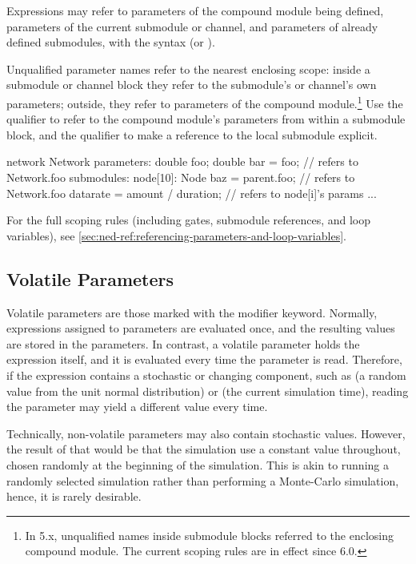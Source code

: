 Expressions may refer to parameters of the compound module being defined,
parameters of the current submodule or channel, and parameters of already
defined submodules, with the syntax  (or
).

Unqualified parameter names refer to the nearest enclosing scope: inside a
submodule or channel block they refer to the submodule's or channel's own
parameters; outside, they refer to parameters of the compound
module.\footnote{In {\opp} 5.x, unqualified names inside submodule blocks
referred to the enclosing compound module. The current scoping rules are in
effect since {\opp} 6.0.} Use the  qualifier to refer to
the compound module's parameters from within a submodule block, and the
 qualifier to make a reference to the local submodule explicit.

\begin{ned}
network Network
{
    parameters:
        double foo;
        double bar = foo;  // refers to Network.foo
    submodules:
        node[10]: Node {
            baz = parent.foo;  // refers to Network.foo
            datarate = amount / duration;  // refers to node[i]'s params
        }
    ...
}
\end{ned}

For the full scoping rules (including gates, submodule references, and loop
variables), see \ref{sec:ned-ref:referencing-parameters-and-loop-variables}.


\subsection{Volatile Parameters}
\label{sec:ned-lang:volatile}

Volatile parameters are those marked with the  modifier
keyword. Normally, expressions assigned to parameters are evaluated once, and
the resulting values are stored in the parameters. In contrast, a volatile
parameter holds the expression itself, and it is evaluated every time the
parameter is read. Therefore, if the expression contains a stochastic or
changing component, such as  (a random value from the unit
normal distribution) or  (the current simulation time), reading
the parameter may yield a different value every time.

\begin{note}
  Technically, non-volatile parameters may also contain stochastic values.
  However, the result of that would be that the simulation use a constant value
  throughout, chosen randomly at the beginning of the simulation. This is akin
  to running a randomly selected simulation rather than performing a Monte-Carlo
  simulation, hence, it is rarely desirable.
\end{note}

